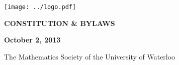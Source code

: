 \documentclass[11pt]{article}
\begin{document}
\begin{titlepage}\begin{center}
\sffamily
\texttt{[image: ../logo.pdf]}

\vspace{10em}

{\Huge \bfseries CONSTITUTION \& BYLAWS}

\vspace{3em}

{\LARGE \bfseries October 2, 2013}

\vspace{7em}

{\LARGE The Mathematics Society of the University of Waterloo}
\end{center}\end{titlepage}

\setcounter{tocdepth}{4}
{\large \sffamily \tableofcontents}

\newpage


\end{document}
